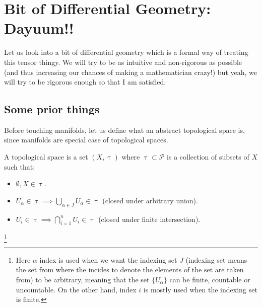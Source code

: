 \section{Bit of  Differential Geometry: Dayuum!!}
Let us look into a bit of differential geometry which is a formal way of treating this tensor thingy. We will try to be as intuitive and non-rigorous as possible (and thus increasing our chances of making a mathematician crazy!) but yeah, we will try to be rigorous enough so that I am satisfied.
\subsection{Some prior things}
Before touching manifolds, let us define what an abstract topological space is, since manifolds are special case of topological spaces. 
\begin{definition}
  A topological space is a set $(X, \uptau )$ where $\uptau \subset \mathcal{P}$ is a collection of subsets of $X$ such that:
\begin{itemize}
    \item $\emptyset, X \in \uptau$.
    \item $U_\alpha \in \uptau \implies \bigcup \limits_{\alpha\in J} U_\alpha \in \uptau$  (closed under arbitrary union).
    \item $U_i \in \uptau \implies \bigcap \limits_{i=1}^n U_i \in \uptau$  (closed under finite intersection)\footnotemark.
\end{itemize}
\end{definition}
\footnote{Here $\alpha$ index is used when we want the indexing set $J$ (indexing set means the set from where the incides to denote the elements of the set are taken from) to be arbitrary, meaning that the set $\{U_\alpha\}$ can be finite, countable or uncountable. On the other hand, index $i$ is mostly used when the indexing set is finite.}

